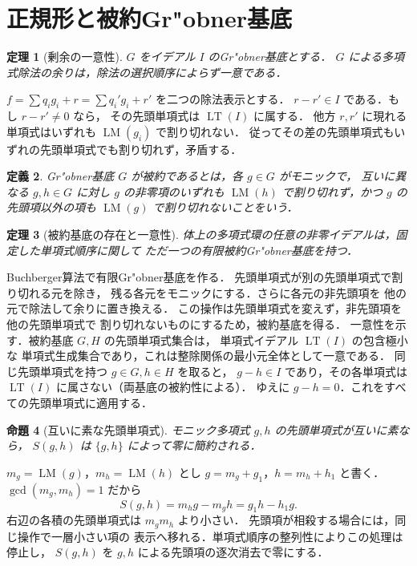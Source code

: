 \documentclass[a5paper,10pt,onecolumn]{jsarticle}
\makeatletter
\theoremstyle{mathnotetheorem}
\newtheorem{theorem}{定理}[section]
\newtheorem{definition}[theorem]{定義}
\newtheorem{proposition}[theorem]{命題}
\renewcommand{\proofname}{証明}
\renewenvironment{proof}[1][\proofname]{%
  \par\pushQED{\qed}\normalfont\topsep4\p@\@plus2\p@\relax
  \trivlist\item[\hskip\labelsep\bfseries #1]\ignorespaces
}{\popQED\endtrivlist\@endpefalse}
\makeatother
\begin{document}
\section{正規形と被約Gr"obner基底}
\begin{theorem}[剰余の一意性]
$G$ をイデアル $I$ のGr"obner基底とする．
$G$ による多項式除法の余りは，除法の選択順序によらず一意である．
\end{theorem}
\begin{proof}
$f=\sum q_i g_i+r=\sum q_i'g_i+r'$ を二つの除法表示とする．
$r-r'\in I$ である．もし $r-r'\ne0$ なら，
その先頭単項式は $\operatorname{LT}(I)$ に属する．
他方 $r,r'$ に現れる単項式はいずれも
$\operatorname{LM}(g_i)$ で割り切れない．
従ってその差の先頭単項式もいずれの先頭単項式でも割り切れず，矛盾する．
\end{proof}
\begin{definition}
Gr"obner基底 $G$ が被約であるとは，各 $g\in G$ がモニックで，
互いに異なる $g,h\in G$ に対し $g$ の非零項のいずれも
$\operatorname{LM}(h)$ で割り切れず，かつ $g$ の先頭項以外の項も
$\operatorname{LM}(g)$ で割り切れないことをいう．
\end{definition}
\begin{theorem}[被約基底の存在と一意性]
体上の多項式環の任意の非零イデアルは，固定した単項式順序に関して
ただ一つの有限被約Gr"obner基底を持つ．
\end{theorem}
\begin{proof}
Buchberger算法で有限Gr"obner基底を作る．
先頭単項式が別の先頭単項式で割り切れる元を除き，
残る各元をモニックにする．さらに各元の非先頭項を
他の元で除法して余りに置き換える．
この操作は先頭単項式を変えず，非先頭項を他の先頭単項式で
割り切れないものにするため，被約基底を得る．
一意性を示す．被約基底 $G,H$ の先頭単項式集合は，
単項式イデアル $\operatorname{LT}(I)$ の包含極小な
単項式生成集合であり，これは整除関係の最小元全体として一意である．
同じ先頭単項式を持つ $g\in G,h\in H$ を取ると，
$g-h\in I$ であり，その各単項式は
$\operatorname{LT}(I)$ に属さない（両基底の被約性による）．
ゆえに $g-h=0$．これをすべての先頭単項式に適用する．
\end{proof}
\begin{proposition}[互いに素な先頭単項式]
モニック多項式 $g,h$ の先頭単項式が互いに素なら，
$S(g,h)$ は $\{g,h\}$ によって零に簡約される．
\end{proposition}
\begin{proof}
$m_g=\operatorname{LM}(g)$，$m_h=\operatorname{LM}(h)$ とし
$g=m_g+g_1$，$h=m_h+h_1$ と書く．
$\gcd(m_g,m_h)=1$ だから
\[
 S(g,h)=m_hg-m_gh=g_1h-h_1g.
\]
右辺の各積の先頭単項式は $m_gm_h$ より小さい．
先頭項が相殺する場合には，同じ操作で一層小さい項の
表示へ移れる．単項式順序の整列性によりこの処理は停止し，
$S(g,h)$ を $g,h$ による先頭項の逐次消去で零にする．
\end{proof}
\end{document}
